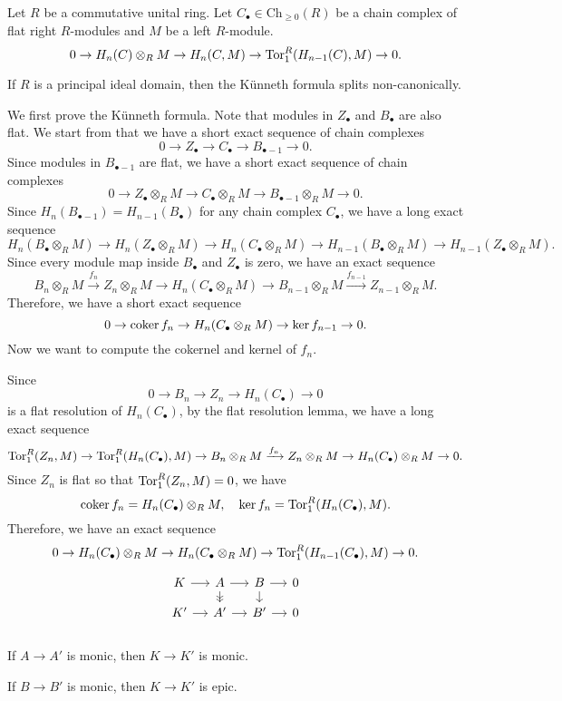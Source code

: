 \documentclass{../../large}
\begin{document}
\begin{prb}
Let $R$ be a commutative unital ring.
Let $C_\bullet\in\mathrm{Ch}_{\ge0}(R)$ be a chain complex of flat right $R$-modules and $M$ be a left $R$-module.
\[0\to H_n(C)\otimes_RM\to H_n(C,M)\to\operatorname{Tor}_1^R(H_{n-1}(C),M)\to0.\]
\begin{parts}
\item If $R$ is a principal ideal domain, then the K\"unneth formula splits non-canonically.
\end{parts}
\end{prb}
\begin{pf}
We first prove the K\"unneth formula.
Note that modules in $Z_\bullet$ and $B_\bullet$ are also flat.
We start from that we have a short exact sequence of chain complexes
\[0\to Z_\bullet\to C_\bullet\to B_{\bullet-1}\to0.\]
Since modules in $B_{\bullet-1}$ are flat, we have a short exact sequence of chain complexes
\[0\to Z_\bullet\otimes_RM\to C_\bullet\otimes_RM\to B_{\bullet-1}\otimes_RM\to0.\]
Since $H_n(B_{\bullet-1})=H_{n-1}(B_\bullet)$ for any chain complex $C_\bullet$, we have a long exact sequence
\[H_n(B_\bullet\otimes_RM)\to H_n(Z_\bullet\otimes_RM)\to H_n(C_\bullet\otimes_RM)\to H_{n-1}(B_\bullet\otimes_RM)\to H_{n-1}(Z_\bullet\otimes_RM).\]
Since every module map inside $B_\bullet$ and $Z_\bullet$ is zero, we have an exact sequence
\[B_n\otimes_RM\xrightarrow{f_n}Z_n\otimes_RM\to H_n(C_\bullet\otimes_RM)\to B_{n-1}\otimes_RM\xrightarrow{f_{n-1}}Z_{n-1}\otimes_RM.\]
Therefore, we have a short exact sequence
\[0\to\operatorname{coker} f_n\to H_n(C_\bullet\otimes_RM)\to\ker f_{n-1}\to0.\]
Now we want to compute the cokernel and kernel of $f_n$.

Since
\[0\to B_n\to Z_n\to H_n(C_\bullet)\to0\]
is a flat resolution of $H_n(C_\bullet)$, by the flat resolution lemma, we have a long exact sequence
\[\operatorname{Tor}_1^R(Z_n,M)\to\operatorname{Tor}_1^R(H_n(C_\bullet),M)\to B_n\otimes_RM\xrightarrow{f_n}Z_n\otimes_RM\to H_n(C_\bullet)\otimes_RM\to0.\]
Since $Z_n$ is flat so that $\operatorname{Tor}_1^R(Z_n,M)=0$, we have
\[\operatorname{coker} f_n=H_n(C_\bullet)\otimes_RM,\quad\ker f_n=\operatorname{Tor}_1^R(H_n(C_\bullet),M).\]
Therefore, we have an exact sequence
\[0\to H_n(C_\bullet)\otimes_RM\to H_n(C_\bullet\otimes_RM)\to\operatorname{Tor}_1^R(H_{n-1}(C_\bullet),M)\to0.\]

\end{pf}




\[\begin{tikzcd}[sep=small]
K \rar & A \rar\dar[->>] & B \rar\dar & 0\\
K' \rar & A' \rar & B' \rar & 0\\
\end{tikzcd}\]
\begin{parts}
\item If $A\to A'$ is monic, then $K\to K'$ is monic.
\item If $B\to B'$ is monic, then $K\to K'$ is epic.
\end{parts}
\end{document}
